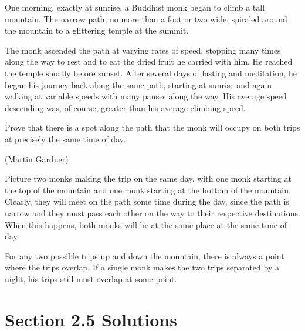 \documentclass[letterpaper, landscape]{exam}
\begin{document}
\begin{questions}
\begin{solution}
    \end{solution}


    \question{}

      One morning, exactly at sunrise, a Buddhist monk began to climb a tall mountain.  The narrow path, no more than a
      foot or two wide, spiraled around the mountain to a glittering temple at the summit.

      The monk ascended the path at varying rates of speed, stopping many times along the way to rest and to eat the dried
      fruit he carried with him.  He reached the temple shortly before sunset.  After several days of fasting and
      meditation, he began his journey back along the same path, starting at sunrise and again walking at variable speeds
      with many pauses along the way.  His average speed descending was, of course, greater than his average climbing
      speed.

      Prove that there is a spot along the path that the monk will occupy on both trips at precisely the same time of day.

      (Martin Gardner)

      \begin{solution}
        Picture two monks making the trip on the same day, with one monk starting at the top of the mountain and one monk
        starting at the bottom of the mountain.  Clearly, they will meet on the path some time during the day, since the
        path is narrow and they must pass each other on the way to their respective destinations.  When this happens, both
        monks will be at the same place at the same time of day.  

        For any two possible trips up and down the mountain, there is always a point where the trips overlap.  If a
        single monk makes the two trips separated by a night, his trips still must overlap at some point.

      \end{solution}

  \end{questions}

  \ifprintanswers{}

    \section{Section 2.5 Solutions} 
\end{document}

